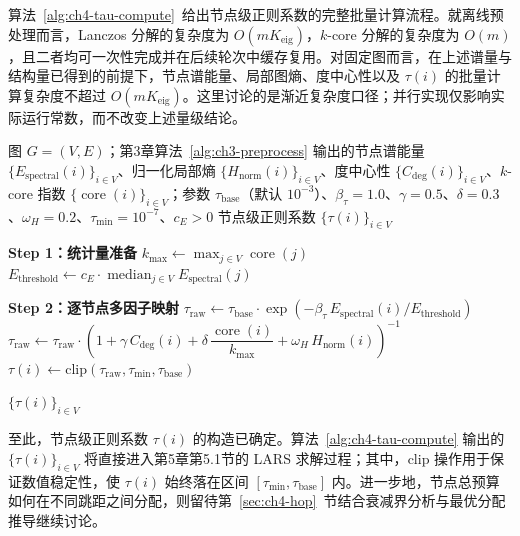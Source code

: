 算法~\ref{alg:ch4-tau-compute}~给出节点级正则系数的完整批量计算流程。就离线预处理而言，Lanczos 分解的复杂度为 \(O(mK_{\text{eig}})\)，\(k\)-core 分解的复杂度为 \(O(m)\)，且二者均可一次性完成并在后续轮次中缓存复用。对固定图而言，在上述谱量与结构量已得到的前提下，节点谱能量、局部图熵、度中心性以及 \(\tau(i)\) 的批量计算复杂度不超过 \(O(mK_{\text{eig}})\)。这里讨论的是渐近复杂度口径；并行实现仅影响实际运行常数，而不改变上述量级结论。

\begin{algorithm}[htbp]
\caption{节点级自适应正则系数批量计算流程}
\label{alg:ch4-tau-compute}
\begin{algorithmic}[1]
\setlength{\algorithmicindent}{2em}
\REQUIRE 图 \(G=(V,E)\)；第3章算法~\ref{alg:ch3-preprocess} 输出的节点谱能量 \(\{E_{\text{spectral}}(i)\}_{i\in V}\)、归一化局部熵 \(\{H_{\text{norm}}(i)\}_{i\in V}\)、度中心性 \(\{C_{\text{deg}}(i)\}_{i\in V}\)、\(k\)-core 指数 \(\{\operatorname{core}(i)\}_{i\in V}\)；参数 \(\tau_{\text{base}}\)（默认 \(10^{-3}\)）、\(\beta_{\tau}=1.0\)、\(\gamma=0.5\)、\(\delta=0.3\)、\(\omega_H=0.2\)、\(\tau_{\min}=10^{-7}\)、\(c_E>0\)
\ENSURE 节点级正则系数 \(\{\tau(i)\}_{i\in V}\)

\STATE \textbf{Step 1：统计量准备}
\STATE \(k_{\max} \leftarrow \max_{j\in V}\operatorname{core}(j)\)
\STATE \(E_{\text{threshold}} \leftarrow c_E \cdot \operatorname{median}_{j\in V} E_{\text{spectral}}(j)\)

\STATE \textbf{Step 2：逐节点多因子映射}
  \STATE \(\tau_{\text{raw}} \leftarrow \tau_{\text{base}}\cdot
  \exp\!\left(-\beta_{\tau}\,E_{\text{spectral}}(i)/E_{\text{threshold}}\right)\)
  \STATE \(\tau_{\text{raw}} \leftarrow \tau_{\text{raw}}\cdot
  \left(1+\gamma\,C_{\text{deg}}(i)+\delta\,\dfrac{\operatorname{core}(i)}{k_{\max}}+\omega_H\,H_{\text{norm}}(i)\right)^{-1}\)
  \STATE \(\tau(i) \leftarrow \mathrm{clip}\!\left(\tau_{\text{raw}},\tau_{\min},\tau_{\text{base}}\right)\)
\ENDFOR

\RETURN \(\{\tau(i)\}_{i\in V}\)
\end{algorithmic}
\end{algorithm}

至此，节点级正则系数 \(\tau(i)\) 的构造已确定。算法~\ref{alg:ch4-tau-compute} 输出的 \(\{\tau(i)\}_{i\in V}\) 将直接进入第5章第5.1节的 LARS 求解过程；其中，\(\mathrm{clip}\) 操作用于保证数值稳定性，使 \(\tau(i)\) 始终落在区间 \([\tau_{\min},\tau_{\text{base}}]\) 内。进一步地，节点总预算如何在不同跳距之间分配，则留待第~\ref{sec:ch4-hop}~节结合衰减界分析与最优分配推导继续讨论。

